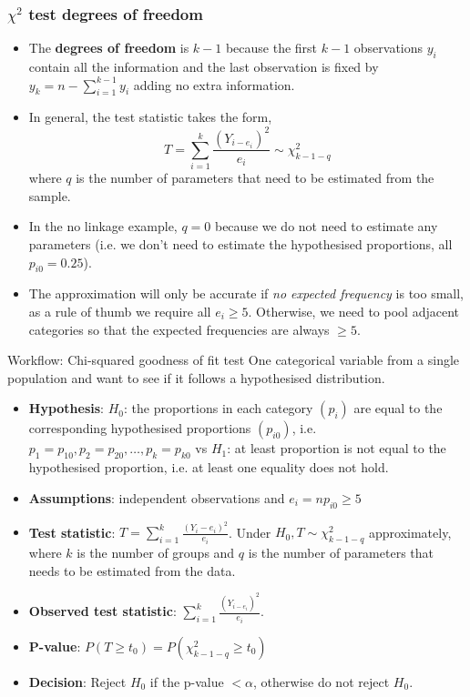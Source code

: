 \documentclass[a4paper]{article}\usepackage[]{graphicx}\usepackage[]{xcolor}
\begin{document}
\subsubsection{\( \chi^2 \) test degrees of freedom}
\begin{itemize}
	\item The \textbf{degrees of freedom} is \( k-1 \) because the first \( k-1 \) observations \( y_i \) contain all the information and the last observation is fixed by \( y_k = n - \sum\limits_{i=1}^{k-1} y_i \) adding no extra information.
	\item In general, the test statistic takes the form,
	\[
		T = \sum_{i=1}^{k} \frac{(Y_{i-e_i})^2}{e_i} \sim \chi^2_{k-1-q}
	\]
	where \( q \) is the number of parameters that need to be estimated from the sample.
	\item In the no linkage example, \( q = 0 \) because we do not need to estimate any parameters (i.e. we don't need to estimate the hypothesised proportions, all \( p_{i0} = 0.25 \)).
	\item  The approximation will only be accurate if \textit{no expected frequency} is too small, as a rule of thumb we require all \( e_i \geq 5 \). Otherwise, we need to pool adjacent categories so that the expected frequencies are always \( \geq 5 \).
\end{itemize}
\begin{redbox}{Workflow: Chi-squared goodness of fit test}
	One categorical variable from a single population and want to see if it follows a hypothesised distribution.
	\begin{itemize}
		\item \textbf{Hypothesis}: \( H_0 \): the proportions in each category \( (p_i) \) are equal to the corresponding hypothesised proportions \( (p_{i0}) \), i.e. \( p_1 = p_{10}, p_2 = p_{20}, \dotsc, p_k = p_{k0} \) vs \( H_1 \): at least proportion is not equal to the hypothesised proportion, i.e. at least one equality does not hold.
		\item \textbf{Assumptions}: independent observations and \( e_i = np_{i0} \geq 5 \)
		\item \textbf{Test statistic}: \( T = \sum\limits_{i=1}^{k} \frac{(Y_i -e_i)^2}{e_i} \). Under \( H_0, T \sim \chi^2_{k-1-q} \) approximately, where \( k \) is the number of groups and \( q \) is the number of parameters that needs to be estimated from the data.
		\item \textbf{Observed test statistic}: \( \sum\limits_{i=1}^{k} \frac{(Y_{i-e_i})^2}{e_i} \).
		\item \textbf{P-value}: \( P(T\geq t_0) = P(\chi^2_{k-1-q} \geq t_0) \)
		\item \textbf{Decision}: Reject \( H_0 \) if the p-value \( < \alpha \), otherwise do not reject \( H_0 \).
	\end{itemize}
\end{redbox}
\end{document}
